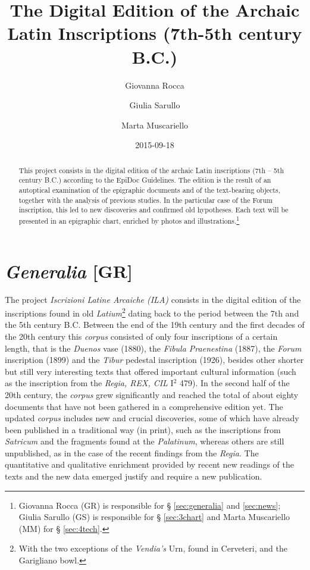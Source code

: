 \documentclass[amsthm,ebook]{saparticle}
\title{The Digital Edition of the Archaic Latin Inscriptions (7th{}-5th century B.C.)}
\author[unimi]{Giovanna Rocca }
\author[kore]{Giulia Sarullo \corref{first}}
\author[unimi]{Marta Muscariello}
\date{2015-09-18}
\begin{document}
\maketitle
\begin{abstract}
This project consists in the digital edition of the archaic Latin inscriptions (7th – 5th century B.C.) according to the
EpiDoc Guidelines. The edition is the result of an autoptical examination of the epigraphic documents and of the
text-bearing objects, together with the analysis of previous studies. In the particular case of the Forum inscription,
this led to new discoveries and confirmed old hypotheses. Each text will be presented in an epigraphic chart, enriched
by photos and illustrations.\footnote{Giovanna Rocca (GR) is responsible for § \ref{sec:generalia} and \ref{sec:news};
Giulia Sarullo (GS) is responsible for § \ref{sec:3chart} and Marta Muscariello (MM) for § \ref{sec:4tech}.}
\end{abstract}







\section{\emph{Generalia} [GR]}\label{sec:generalia}


\noindent The project \emph{Iscrizioni Latine Arcaiche (ILA)} consists in the digital edition of the inscriptions found in old
\emph{Latium}\footnote{With the two exceptions of the \emph{Vendia's} Urn, found in Cerveteri, and the Garigliano bowl.}
dating back to the period between the 7th and the 5th century B.C. Between the end of the 19th century and the first
decades of the 20th century this \emph{corpus} consisted of only four inscriptions of a certain length, that is the \emph{Duenos}
vase (1880), the \emph{Fibula Praenestina} (1887), the \emph{Forum} inscription (1899) and the \emph{Tibur} pedestal inscription (1926),
besides other shorter but still very interesting texts that offered important cultural information (such as the
inscription from the \emph{Regia, REX, CIL} I$^2$ 479). In the second half of the 20th century, the \emph{corpus} grew significantly and
reached the total of about eighty documents that have not been gathered in a comprehensive edition yet. The updated
\emph{corpus} includes new and crucial discoveries, some of which have already been published in a traditional way (in print),
such as the inscriptions from \emph{Satricum} and the fragments found at the \emph{Palatinum}, whereas others are still unpublished,
as in the case of the recent findings from the \emph{Regia}. The quantitative and qualitative enrichment provided by recent
new readings of the texts and the new data emerged justify and require a new publication. 
\end{document}

